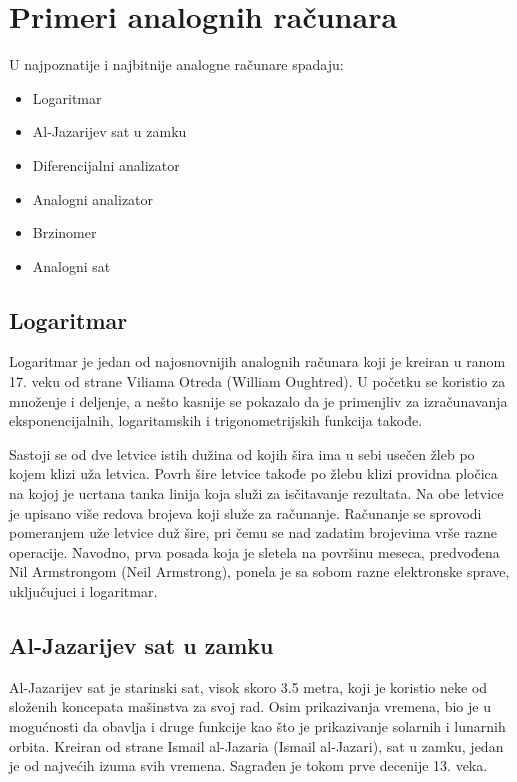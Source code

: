\documentclass[a4paper]{article}
\begin{document}
{\section{Primeri analognih računara}
\label{sec:naslov1}

U najpoznatije i najbitnije analogne računare spadaju:
	\begin{itemize}
		\item Logaritmar
		\item Al-Jazarijev sat u zamku
 		\item Diferencijalni analizator
		\item Analogni analizator
		\item Brzinomer
		\item Analogni sat
	\end{itemize}

\subsection{Logaritmar}
\label{subsec:podnaslov1}

Logaritmar je jedan od najosnovnijih analognih računara koji je kreiran u ranom 17. veku od strane Viliama Otreda (William Oughtred). U početku se koristio za množenje i deljenje, a nešto kasnije se pokazalo da je primenjliv za izračunavanja eksponencijalnih, logaritamskih i trigonometrijskih funkcija takođe.

Sastoji se od dve letvice istih dužina od kojih šira ima u sebi usečen žleb po kojem klizi uža letvica. Povrh šire letvice takođe po žlebu klizi providna pločica na kojoj je ucrtana tanka linija koja služi za isčitavanje rezultata. Na obe letvice je upisano više redova brojeva koji služe za računanje.
Računanje se sprovodi pomeranjem uže letvice duž šire, pri čemu se nad zadatim brojevima vrše razne operacije.
Navodno, prva posada koja je sletela na površinu meseca, predvođena Nil Armstrongom (Neil Armstrong), ponela je sa sobom razne elektronske sprave, uključujuci i logaritmar.

\subsection{Al-Jazarijev sat u zamku}
\label{subsec:podnaslov2}

Al-Jazarijev sat je starinski sat, visok skoro 3.5 metra, koji je koristio neke od složenih koncepata mašinstva za svoj rad. Osim prikazivanja vremena, bio je u mogućnosti da obavlja i druge funkcije kao što je prikazivanje solarnih i lunarnih orbita. Kreiran od strane Ismail al-Jazaria (Ismail al-Jazari), sat u zamku, jedan je od najvećih izuma svih vremena. Sagrađen je tokom prve decenije 13. veka. 

}
\end{document}
